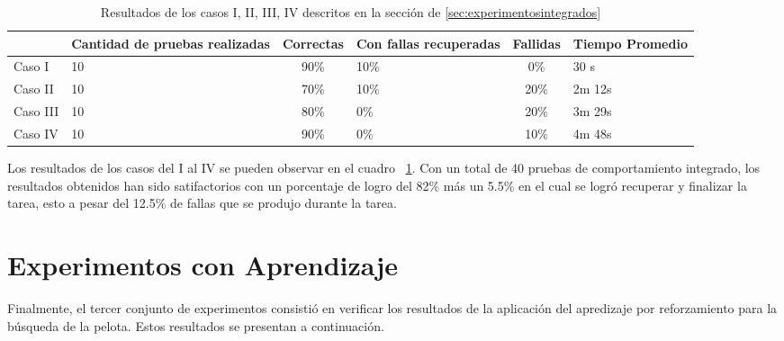 \begin{table}
\centering

\begin{tabular}{p{3cm} p{2cm} c p{2cm} c p{2cm}}
\hline 
& Cantidad de 
pruebas realizadas & Correctas & Con fallas recuperadas & Fallidas & Tiempo Promedio \\ 
\hline 
Caso I & 10 & 90\% & 10\% & 0\% & 30 s \\ 
Caso II & 10 & 70\% & 10\% & 20\% & 2m 12s \\ 
Caso III & 10 & 80\% & 0\% & 20\% & 3m 29s \\ 
Caso IV & 10 & 90\% & 0\% & 10\% & 4m 48s \\ 
\hline 
\end{tabular} 

\caption{Resultados de los casos I, II, III, IV descritos en la secci\'on de \ref{sec:experimentosintegrados}}
\label{fig:casos}

\end{table}

Los resultados de los casos del I al IV se pueden observar en el cuadro ~\ref{fig:casos}. Con un total de 40 pruebas de comportamiento integrado, los resultados obtenidos han sido satifactorios con un porcentaje de logro del 82\% más un 5.5\% en el cual se logró recuperar y finalizar la tarea, esto a pesar del 12.5\% de fallas que se produjo durante la tarea. %



\section{Experimentos con Aprendizaje}\label{sec:experimentosAprend}

Finalmente, el tercer conjunto de experimentos consistió en verificar los resultados de la aplicaci\'on del apredizaje por reforzamiento para la búsqueda de la pelota. Estos resultados se presentan a continuaci\'on.

